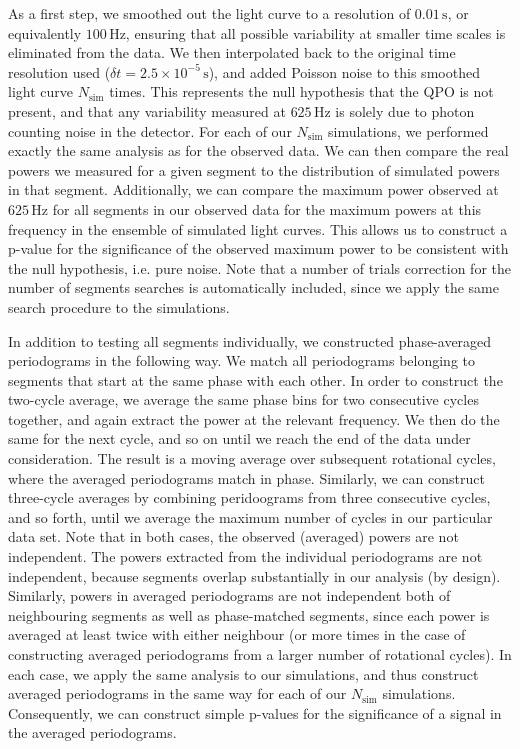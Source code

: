 \documentclass{emulateapj}
\begin{document}
As a first step, we smoothed out the light curve to a resolution of $0.01 \, \mathrm{s}$, or equivalently $100 \, \mathrm{Hz}$, ensuring that all possible variability at smaller time scales is eliminated from the data. We then interpolated back to the original time resolution used ($\delta t = 2.5 \times 10^{-5} \, \mathrm{s}$), and added Poisson noise to this smoothed light curve $N_{\mathrm{sim}}$ times. This represents the null hypothesis that the QPO is not present, and that any variability measured at $625 \, \mathrm{Hz}$ is solely due to photon counting noise in the detector. For each of our $N_{\mathrm{sim}}$ simulations, we performed exactly the same analysis as for the observed data. We can then compare the real powers we measured for a given segment to the distribution of simulated powers in that segment. Additionally, we can compare the maximum power observed at $625 \, \mathrm{Hz}$ for all segments in our observed data for the maximum powers at this frequency in the ensemble of simulated light curves. This allows us to construct a p-value for the significance of the observed maximum power to be consistent with the null hypothesis, i.e. pure noise. Note that a number of trials correction for the number of segments searches is automatically included, since we apply the same search procedure to the simulations.


In addition to testing all segments individually, we constructed phase-averaged periodograms in the following way. We match all periodograms belonging to segments that start at the same phase with each other. In order to construct the two-cycle average, we average the same phase bins for two consecutive cycles together, and again extract the power at the relevant frequency. We then do the same for the next cycle, and so on until we reach the end of the data under consideration. The result is a moving average over subsequent rotational cycles, where the averaged periodograms match in phase.
Similarly, we can construct three-cycle averages by combining peridoograms from three consecutive cycles, and so forth, until we average the maximum number of cycles in our particular data set. Note that in both cases, the observed (averaged) powers are not independent. The powers extracted from the individual periodograms are not independent, because segments overlap substantially in our analysis (by design). 
Similarly, powers in averaged periodograms are not independent both of neighbouring segments as well as phase-matched segments, since each power is averaged at least twice with either neighbour (or more times in the case of constructing averaged periodograms from a larger number of rotational cycles). 
In each case, we apply the same analysis to our simulations, and thus construct averaged periodograms in the same way for each of our $N_\mathrm{sim}$ simulations. Consequently, we can construct simple p-values for the significance of a signal in the averaged periodograms. 
 
\end{document}

